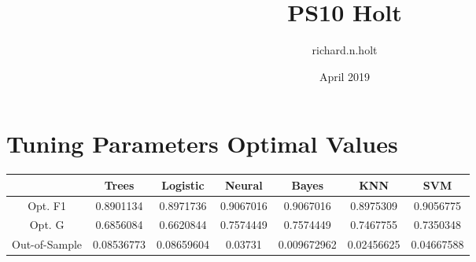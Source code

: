 \documentclass{article}
\title{PS10 Holt}
\author{richard.n.holt }
\date{April 2019}
\begin{document}
\maketitle

\section{Tuning Parameters Optimal Values}

\begin{center}
 \begin{tabular}{||c c c c c c c||} 
 \hline
  & Trees & Logistic & Neural & Bayes & KNN & SVM \\ [0.5ex] 
 \hline\hline
 Opt. F1 & 0.8901134 & 0.8971736 & 0.9067016 & 0.9067016 & 0.8975309 & 0.9056775 \\ 
 \hline
 Opt. G & 0.6856084 & 0.6620844 & 0.7574449 & 0.7574449 & 0.7467755 & 0.7350348 \\ 
 \hline
 Out-of-Sample & 0.08536773 & 0.08659604 & 0.03731 & 0.009672962 & 0.02456625 & 0.04667588 \\ 
 \hline
\end{tabular}
\end{center}
\end{document}
